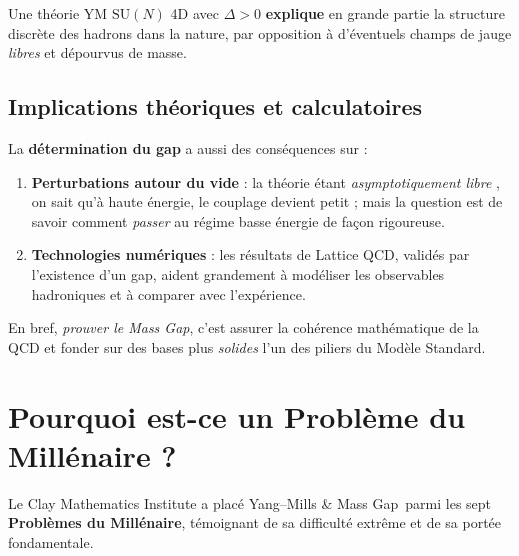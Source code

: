 Une théorie YM \(\mathrm{SU}(N)\) 4D avec \(\Delta > 0\) \textbf{explique} en grande partie la structure discrète des hadrons dans la nature, par opposition à d’éventuels champs de jauge \emph{libres} et dépourvus de masse.

\subsection*{Implications théoriques et calculatoires}
La \textbf{détermination du gap} a aussi des conséquences sur :
\begin{enumerate}
	\item \textbf{Perturbations autour du vide} : la théorie étant \emph{asymptotiquement libre} \cite{GrossWilczek1973,Politzer1973}, on sait qu’à haute énergie, le couplage devient petit ; mais la question est de savoir comment \emph{passer} au régime basse énergie de façon rigoureuse.  
	\item \textbf{Technologies numériques} : les résultats de Lattice QCD, validés par l’existence d’un gap, aident grandement à modéliser les observables hadroniques et à comparer avec l’expérience.  
\end{enumerate}

En bref, \textit{prouver le Mass Gap}, c’est assurer la cohérence mathématique de la QCD et fonder sur des bases plus \emph{solides} l’un des piliers du Modèle Standard.

\section{Pourquoi est-ce un Problème du Millénaire ?}
\label{sec:1.3}

Le Clay Mathematics Institute a placé \og Yang--Mills \& Mass Gap\fg\ parmi les sept \textbf{Problèmes du Millénaire}, témoignant de sa difficulté extrême et de sa portée fondamentale. 

